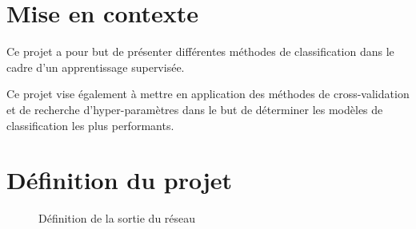 \section{Mise en contexte}
Ce projet a pour but de présenter différentes méthodes de classification dans le cadre d'un apprentissage supervisée. 

Ce projet vise également à mettre en application des méthodes de cross-validation et de recherche d'hyper-paramètres dans le but de déterminer les modèles de classification les plus performants. 
\section{Définition du projet}
    \label{sec:definition_projet}
    
    \pagebreak
    \begin{figure}[H]
        \centering
        \caption[Définition de la sortie du réseau]{Définition de la sortie du réseau\footnotemark}
        \label{fig:definition_sortie_reseau}
    \end{figure}